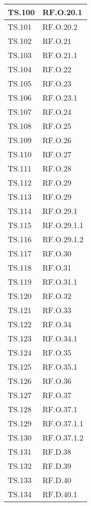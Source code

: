 {{{{{{{{{{\begin{tabularx}{\textwidth}{p{}|X}
    \hline
    TS.100 & RF.O.20.1 \\
    \hline
    TS.101 & RF.O.20.2 \\
    \hline
    TS.102 & RF.O.21 \\
    \hline
    TS.103 & RF.O.21.1 \\
    \hline
    TS.104 & RF.O.22 \\
    \hline
    TS.105 & RF.O.23 \\
    \hline
    TS.106 & RF.O.23.1 \\
    \hline
    TS.107 & RF.O.24 \\
    \hline
    TS.108 & RF.O.25 \\
    \hline
    TS.109 & RF.O.26 \\
    \hline
    TS.110 & RF.O.27 \\
    \hline
    TS.111 & RF.O.28 \\
    \hline
    TS.112 & RF.O.29 \\
    \hline
        TS.113 & RF.O.29 \\
    \hline
    TS.114 & RF.O.29.1 \\
    \hline
    TS.115 & RF.O.29.1.1 \\
    \hline
    TS.116 & RF.O.29.1.2 \\
    \hline
    TS.117 & RF.O.30 \\
    \hline
    TS.118 & RF.O.31 \\
    \hline
    TS.119 & RF.O.31.1 \\
    \hline
    TS.120 & RF.O.32 \\
    \hline
    TS.121 & RF.O.33 \\
    \hline
    TS.122 & RF.O.34 \\
    \hline
    TS.123 & RF.O.34.1 \\
    \hline
    TS.124 & RF.O.35 \\
    \hline
    TS.125 & RF.O.35.1 \\
    \hline
    TS.126 & RF.O.36 \\
    \hline
    TS.127 & RF.O.37 \\
    \hline
    TS.128 & RF.O.37.1 \\
    \hline
    TS.129 & RF.O.37.1.1 \\
    \hline
    TS.130 & RF.O.37.1.2 \\
    \hline
    TS.131 & RF.D.38 \\
    \hline
    TS.132 & RF.D.39 \\
    \hline
    TS.133 & RF.D.40 \\
    \hline
    TS.134 & RF.D.40.1 \\

\end{tabularx}}}}}}}}}}}
